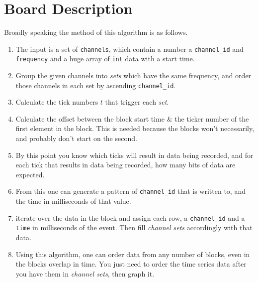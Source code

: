 \documentclass{article}
\begin{document}
	\section{Board Description}
 Broadly speaking the method of this algorithm is as follows.
		\begin{enumerate}
			\item The input is a set of \texttt{channels}, which contain a number a \texttt{channel\_id} and \texttt{frequency} and a huge array of \texttt{int} data with a start time.
			\item Group the given channels into \emph{sets} which have the same frequency, and order those channels in each set by ascending \texttt{channel\_id}.
			\item Calculate the tick numbers $t$ that trigger each \emph{set}.
			\item Calculate the offset between the block start time \& the ticker number of the first element in the block. This is needed because the blocks won't necessarily, and probably don't start on the second.
			\item By this point you know which ticks will result in data being recorded, and for each tick that results in data being recorded, how many bits of data are expected.
			\item From this one can generate a pattern of \texttt{channel\_id} that is written to, and the time in milliseconds of that value.
			\item iterate over the data in the block and assign each row, a \texttt{channel\_id} and a \texttt{time} in milliseconds of the event. Then fill \emph{channel sets} accordingly with that data.
			\item Using this algorithm, one can order data from any number of blocks, even in the blocks overlap in time. You just need to order the time series data after you have them in \emph{channel sets}, then graph it.	
		\end{enumerate} 
\end{document}
